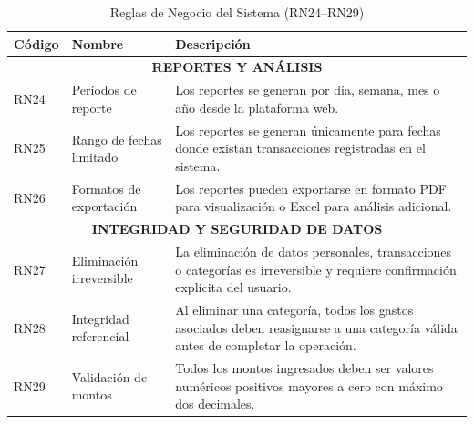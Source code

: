 \begin{table}[H]
\centering
\renewcommand{\arraystretch}{1.2}
\begin{tabularx}{\textwidth}{@{} l l X @{}}
\toprule
\textbf{Código} & \textbf{Nombre} & \textbf{Descripción} \\
\midrule

\multicolumn{3}{c}{\textbf{REPORTES Y ANÁLISIS}} \\
\midrule

RN24 & Períodos de reporte &
Los reportes se generan por día, semana, mes o año desde la plataforma web. \\

RN25 & Rango de fechas limitado &
Los reportes se generan únicamente para fechas donde existan transacciones registradas en el sistema. \\

RN26 & Formatos de exportación &
Los reportes pueden exportarse en formato PDF para visualización o Excel para análisis adicional. \\

\midrule
\multicolumn{3}{c}{\textbf{INTEGRIDAD Y SEGURIDAD DE DATOS}} \\
\midrule

RN27 & Eliminación irreversible &
La eliminación de datos personales, transacciones o categorías es irreversible y requiere confirmación explícita del usuario. \\

RN28 & Integridad referencial &
Al eliminar una categoría, todos los gastos asociados deben reasignarse a una categoría válida antes de completar la operación. \\

RN29 & Validación de montos &
Todos los montos ingresados deben ser valores numéricos positivos mayores a cero con máximo dos decimales. \\


\bottomrule
\end{tabularx}
\caption{Reglas de Negocio del Sistema (RN24–RN29)}
\end{table}
